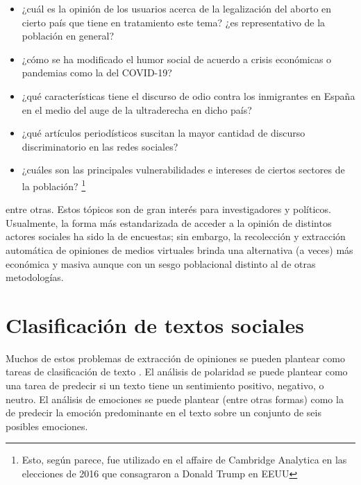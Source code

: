 \begin{itemize}
    \item ¿cuál es la opinión de los usuarios acerca de la legalización del aborto en cierto país que tiene en tratamiento este tema? ¿es representativo de la población en general? \cite{graells2019abortion}
    \item ¿cómo se ha modificado el humor social de acuerdo a crisis económicas o pandemias como la del COVID-19? \cite{brufau2020emotion}
    \item ¿qué características tiene el discurso de odio  contra los inmigrantes en España en el medio del auge de la ultraderecha en dicho país? \cite{calderon2020topic}
    \item ¿qué artículos periodísticos suscitan la mayor cantidad de discurso discriminatorio en las redes sociales?
    \item ¿cuáles son las principales vulnerabilidades e intereses de ciertos sectores de la población? \cite{zuiderveen2018online} \footnote{Esto, según parece, fue utilizado en el affaire de Cambridge Analytica en las elecciones de 2016 que consagraron a Donald Trump en EEUU}
\end{itemize}

entre otras. Estos tópicos son de gran interés para investigadores y políticos. Usualmente, la forma más estandarizada de acceder a la opinión de distintos actores sociales ha sido la de encuestas; sin embargo, la recolección y extracción automática de opiniones de medios virtuales brinda una alternativa (a veces) más económica y masiva aunque con un sesgo poblacional distinto al de otras metodologías.

\section{Clasificación de textos sociales}

Muchos de estos problemas de extracción de opiniones se pueden plantear como tareas de clasificación de texto \cite{pang2008opinion}. El análisis de polaridad se puede plantear como una tarea de predecir si un texto tiene un sentimiento positivo, negativo, o neutro. El análisis de emociones se puede plantear (entre otras formas) como la de predecir la emoción predominante en el texto sobre un conjunto de seis posibles emociones.

